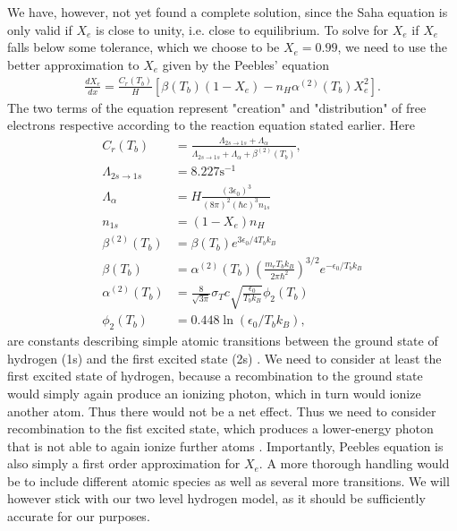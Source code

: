 \documentclass[twocolumn]{aastex62}
\begin{document}
We have, however, not yet found a complete solution, since the Saha equation is only valid if $X_e$ is close to unity, i.e. close to equilibrium. To solve for $X_e$ if $X_e$ falls below some tolerance, which we choose to be $X_e = 0.99$, we need to use the better approximation to $X_e$ given by the Peebles' equation
\begin{align}
    \frac{dX_e}{dx} = \frac{C_r(T_b)}{H} \left[\beta(T_b)(1-X_e) - n_H
              \alpha^{(2)}(T_b)X_e^2\right].
    \label{eq:peebles}
\end{align}
The two terms of the equation represent "creation" and "distribution" of free electrons respective according to the reaction equation stated earlier. 
Here 
\begin{align}
    C_r(T_b) &= \frac{\Lambda_{2s\rightarrow1s} +
              \Lambda_{\alpha}}{\Lambda_{2s\rightarrow1s} + \Lambda_{\alpha} +
              \beta^{(2)}(T_b)}, \\
    \Lambda_{2s\rightarrow1s} &= 8.227 \textrm{s}^{-1}\\
    \Lambda_{\alpha} &= H\frac{(3\epsilon_0)^3}{(8\pi)^2 (\hbar c)^3 n_{1s}}\\
    n_{1s} &= (1-X_e)n_H \\
    \beta^{(2)}(T_b) &= \beta(T_b) e^{3\epsilon_0/4T_bk_B} \\
    \beta(T_b) &= \alpha^{(2)}(T_b) \left(\frac{m_e
              T_bk_B}{2\pi \hbar^2}\right)^{3/2} e^{-\epsilon_0/T_bk_B} \\
    \alpha^{(2)}(T_b) &= \frac{8}{\sqrt{3\pi}}
              \sigma_T c\sqrt{\frac{\epsilon_0}{T_bk_B}}\phi_2(T_b) \\
    \phi_2(T_b) &= 0.448\ln(\epsilon_0/T_bk_B),
\end{align}
are constants describing simple atomic transitions between the ground state of hydrogen (1s) and the first excited state (2s) \citep[]{winther:2020}. We need to consider at least the first excited state of hydrogen, because a recombination to the ground state would simply again produce an ionizing photon, which in turn would ionize another atom. Thus there would not be a net effect. Thus we need to consider recombination to the fist excited state, which produces a lower-energy photon that is not able to again ionize further atoms \citep[p. 71]{dodelson:2003}. Importantly, Peebles equation is also simply a first order approximation for $X_e$. A more thorough handling would be to include different atomic species as well as several more transitions. We will however stick with our two level hydrogen model, as it should be sufficiently accurate for our purposes.
\end{document}
